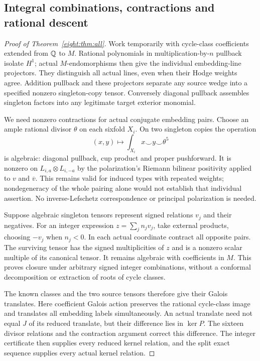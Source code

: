 \subsection{Integral combinations, contractions and rational descent}
\begin{proof}[Proof of Theorem~\ref{eight:thm:all}]
Work temporarily with cycle-class coefficients extended from $\mathbb Q$ to
$M$. Rational polynomials in multiplication-by-$n$ pullback isolate
$H^1$; actual $M$-endomorphisms then give the individual embedding-line
projectors. They distinguish all actual lines, even when their Hodge
weights agree. Addition pullback and these projectors separate any
source wedge into a specified nonzero singleton-copy tensor.
Conversely diagonal pullback assembles singleton factors into any
legitimate target exterior monomial.

We need nonzero contractions for actual conjugate embedding pairs.
Choose an ample rational divisor $\theta$ on each sixfold $X_i$.
On two singleton copies the operation
\[
 (x,y)\longmapsto\int_{X_i}x\smile y\smile\theta^5
\]
is algebraic: diagonal pullback, cup product and proper pushforward.
It is nonzero on $L_{i,a}\otimes L_{i,-a}$ by the polarization's
Riemann bilinear positivity applied to $v$ and $\overline v$.
This remains valid for induced types with repeated weights;
nondegeneracy of the whole pairing alone would not establish that
individual assertion. No inverse-Lefschetz correspondence or principal
polarization is needed.

Suppose algebraic singleton tensors represent signed relations
$v_j$ and their negatives. For an integer expression
$z=\sum_j n_jv_j$, take external products, choosing $-v_j$ when
$n_j<0$. In each actual coordinate contract all opposite pairs.
The surviving tensor has the signed multiplicities of $z$ and is a
nonzero scalar multiple of its canonical tensor. It remains algebraic
with coefficients in $M$. This proves closure under arbitrary signed
integer combinations, without a conformal decomposition or extraction
of roots of cycle classes.

The known classes and the two source tensors therefore give their
Galois translates. Here coefficient Galois action preserves the
rational cycle-class image and translates all embedding labels
simultaneously. An actual translate need not equal $J$ of its reduced
translate, but their difference lies in $\ker P$. The sixteen divisor
relations and the contraction argument correct this difference.
The integer certificate then supplies every reduced kernel relation,
and the split exact sequence supplies every actual kernel relation.


\end{proof}
